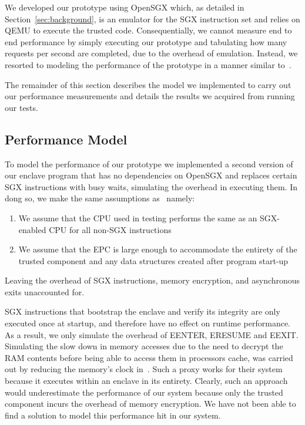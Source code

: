 \documentclass[../main.tex]{subfiles}
\begin{document}
We developed our prototype using OpenSGX which, as detailed in
Section~\ref{sec:background}, is an emulator for the SGX instruction
set and relies on QEMU to execute the trusted code. Consequentially,
we cannot measure end to end performance by simply executing our
prototype and tabulating how many requests per second are completed,
due to the overhead of emulation.  Instead, we resorted to modeling
the performance of the prototype in a manner similar
to~\cite{Baumann14}.

The remainder of this section describes the model we implemented to
carry out our performance measurements and details the results we
acquired from running our tests.

\subsection{Performance Model}

To model the performance of our prototype we implemented a second
version of our enclave program that has no dependencies on OpenSGX and
replaces certain SGX instructions with busy waits, simulating the overhead in
executing them. In dong so, we make the same assumptions as~\cite{Baumann14}
namely:
\begin{enumerate}
  \item We assume that the CPU used in testing performs the same as an
    SGX-enabled CPU for all non-SGX instructions
  \item We assume that the EPC is large enough to accommodate the
    entirety of the trusted component and any data structures created
    after program start-up
\end{enumerate}
Leaving the overhead of SGX instructions, memory encryption, and
asynchronous exits unaccounted for.

SGX instructions that bootstrap the enclave and verify its integrity
are only executed once at startup, and therefore have no effect on runtime
performance. As a result, we only simulate the overhead of EENTER,
ERESUME and EEXIT. Simulating the slow down in memory accesses due to the need
to decrypt the RAM contents before being able to access them in processors
cache, was carried out by reducing the memory's clock in~\cite{Baumann14}.
Such a proxy works for their system because it executes within an enclave in
its entirety. Clearly, such an approach would underestimate the performance of
our system because only the trusted component incurs the overhead of memory
encryption. We have not been able to find a solution to model this performance
hit in our system.
\end{document}
